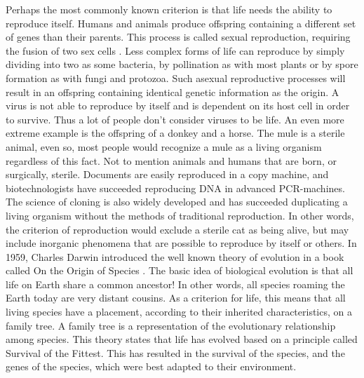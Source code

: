 Perhaps the most commonly known criterion is that life needs the ability to reproduce itself. Humans and animals produce offspring containing a different set of genes than their parents. This process is called sexual reproduction, requiring the fusion of two sex cells \cite{reprod}. Less complex forms of life can reproduce by simply dividing into two as some bacteria, by pollination as with most plants or by spore formation as with fungi and protozoa. Such asexual reproductive processes will result in an offspring containing identical genetic information as the origin. A virus is not able to reproduce by itself and is dependent on its host cell in order to survive. Thus a lot of people don't consider viruses to be life. An even more extreme example is the offspring of a donkey and a horse. The mule is a sterile animal, even so, most people would recognize a mule as a living organism regardless of this fact. Not to mention animals and humans
that are born, or surgically, sterile. Documents are easily reproduced in a copy machine, and biotechnologists have succeeded reproducing DNA in advanced PCR-machines. The science of cloning is also widely developed and has succeeded duplicating a living organism without the methods of traditional reproduction. In other words, the criterion of reproduction would exclude a sterile cat as being alive, but may include inorganic phenomena that are possible to reproduce by itself or others.
In 1959, Charles Darwin introduced the well known theory of evolution in a book called On the Origin of Species \cite{Darwin}. The basic idea of biological evolution is that all life on Earth share a common ancestor! In other words, all species roaming the Earth today are very distant cousins. As a criterion for life, this means that all living species have a placement, according to their inherited characteristics, on a family tree. A family tree is a representation of the evolutionary relationship among species. This theory states that life has evolved based on a principle called Survival of the Fittest. This has resulted in the survival of the species, and the genes of the species, which were best adapted to their environment. 

